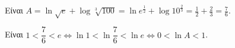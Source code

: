 \begin{alist}
\item Είναι $A = \ln\sqrt{e} + \log\sqrt[3]{100} = \ln e^{\frac{1}{2}} + \log 10^{\frac{2}{3}} = \frac{1}{2} + \frac{2}{3} = \frac{7}{6}$.
\item Είναι $1 < \dfrac{7}{6} < e \Leftrightarrow \ln 1 < \ln\dfrac{7}{6} < \ln e \Leftrightarrow 0 < \ln A < 1$.
\end{alist}

